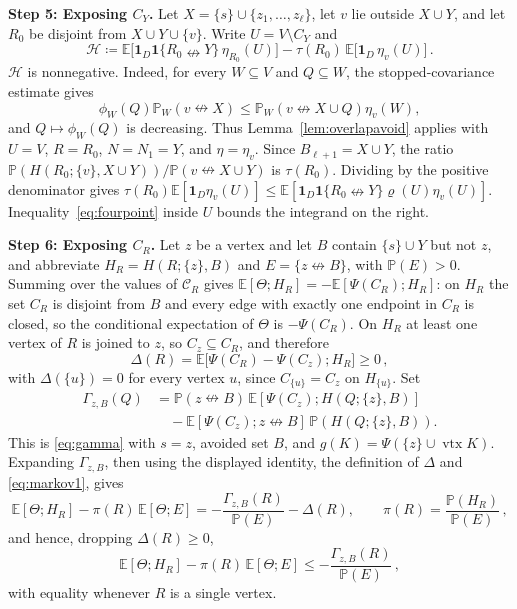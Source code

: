 \documentclass[11pt]{article}
\theoremstyle{definition}
\theoremstyle{remark}
\newcommand{\PP}{\mathbb P}
\newcommand{\EE}{\mathbb E}
\newcommand{\one}{\mathbf 1}
\newcommand{\ncon}{\nleftrightarrow}
\newcommand{\eC}{\mathcal C}
\DeclareMathOperator{\vtx}{vtx}
\begin{document}
\medskip\noindent\textbf{Step 5: Exposing $C_Y$.}
Let $X=\{s\}\cup\{z_1,\dots,z_\ell\}$, let $v$ lie outside $X\cup Y$, and let $R_0$ be
disjoint from $X\cup Y\cup\{v\}$. Write $U=V\setminus C_Y$ and
\[
 \mathcal H\coloneqq\EE\bigl[\one_D\one\{R_0\ncon Y\}\,\eta_{R_0}(U)\bigr]
 -\tau(R_0)\,\EE\bigl[\one_D\,\eta_v(U)\bigr]\,.
\]
$\mathcal H$ is nonnegative. Indeed, for every $W\subseteq V$ and $Q\subseteq W$, the
stopped-covariance estimate gives
\[
 \phi_W(Q)\PP_W(v\ncon X)\leq
 \PP_W(v\ncon X\cup Q)\eta_v(W),
\]
and $Q\mapsto\phi_W(Q)$ is decreasing. Thus Lemma~\ref{lem:overlapavoid} applies with
$U=V$, $R=R_0$, $N=N_1=Y$, and $\eta=\eta_v$. Since $B_{\ell+1}=X\cup Y$, the ratio
$\PP(H(R_0;\{v\},X\cup Y))/\PP(v\ncon X\cup Y)$ is $\tau(R_0)$. Dividing by the positive
denominator gives
$\tau(R_0)\EE[\one_D\eta_v(U)]\leq
\EE[\one_D\one\{R_0\ncon Y\}\varrho(U)\eta_v(U)]$.
Inequality~\eqref{eq:fourpoint} inside $U$ bounds the integrand on the right.

\medskip\noindent\textbf{Step 6: Exposing $C_R$.}
Let $z$ be a vertex and let $B$ contain $\{s\}\cup Y$ but not $z$, and abbreviate
$H_R=H(R;\{z\},B)$ and $E=\{z\ncon B\}$, with $\PP(E)>0$. Summing over the values of
$\eC_R$ gives $\EE[\Theta;H_R]=-\EE[\Psi(C_R);H_R]$: on $H_R$ the set $C_R$ is disjoint
from $B$ and every edge with exactly one endpoint in $C_R$ is closed, so the conditional expectation of
$\Theta$ is $-\Psi(C_R)$. On $H_R$ at least one vertex of $R$ is joined to $z$, so
$C_z\subseteq C_R$, and therefore
\[
 \Delta(R)=\EE\bigl[\Psi(C_R)-\Psi(C_z);H_R\bigr]\geq 0\,,
\]
with $\Delta(\{u\})=0$ for every vertex $u$, since $C_{\{u\}}=C_z$ on $H_{\{u\}}$. Set
\[
\begin{split}
 \Gamma_{z,B}(Q)
 &=\PP(z\ncon B)\,
   \EE[\Psi(C_z);H(Q;\{z\},B)]\\
 &\quad-\EE[\Psi(C_z);z\ncon B]\,
   \PP(H(Q;\{z\},B)).
\end{split}
\]
This is \eqref{eq:gamma} with $s=z$, avoided set $B$, and
$g(K)=\Psi(\{z\}\cup\vtx K)$. Expanding $\Gamma_{z,B}$, then using the
displayed identity, the definition of $\Delta$ and \eqref{eq:markov1}, gives
\begin{equation}\label{eq:cgdi}
 \EE[\Theta;H_R]-\pi(R)\,\EE[\Theta;E]=-\frac{\Gamma_{z,B}(R)}{\PP(E)}-\Delta(R),
 \qquad \pi(R)=\frac{\PP(H_R)}{\PP(E)}\,,
\end{equation}
and hence, dropping $\Delta(R)\geq0$,
\[
 \EE[\Theta;H_R]-\pi(R)\,\EE[\Theta;E]\leq -\frac{\Gamma_{z,B}(R)}{\PP(E)}\,,
\]
with equality whenever $R$ is a single vertex.
\end{document}
